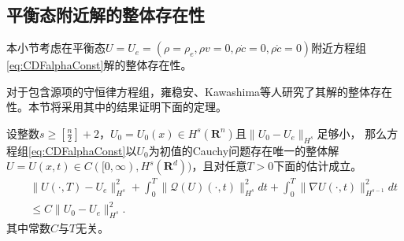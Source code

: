 	
	\subsection{平衡态附近解的整体存在性}
	本小节考虑在平衡态$U=U_e = (\rho = \rho_e, \rho v = 0, \rho \dot{c} = 0, \rho \mathring{c} =0)$附近方程组\eqref{eq:CDFalphaConst}解的整体存在性。  

	对于包含源项的守恒律方程组，雍稳安、Kawashima等人研究了其解的整体存在性\cite{yong2004entropy,kawashima2009decay,kawashima2004dissipative}。本节将采用其中的结果证明下面的定理。
	\begin{theorem} \label{th:Kawashima}
		设整数$s \ge [\frac{n}{2}]+2$，$U_0 = U_0(x) \in H^s(\mathbf{R}^n)$且$\|U_0 -U_e\|_{H^s}$足够小，
		那么方程组\eqref{eq:CDFalphaConst}以$U_0$为初值的Cauchy问题存在唯一的整体解$U=U(x,t) \in C([0,\infty),H^s(\mathbf{R}^d))$，且对任意$T>0$下面的估计成立。
		\begin{eqnarray*}
			&& \|U(\cdot,T) - U_e \|_{H^s}^2 + \int_0^T \| \mathcal{Q}(U)(\cdot,t)\|_{H^s}^2 dt + \int_0^T \|\nabla U (\cdot,t)\|_{H^{s-1}}^2 dt \\
			&& \le C \| U_0 -U_e\|_{H^s}^2.
		\end{eqnarray*}
		其中常数$C$与$T$无关。
	\end{theorem}

